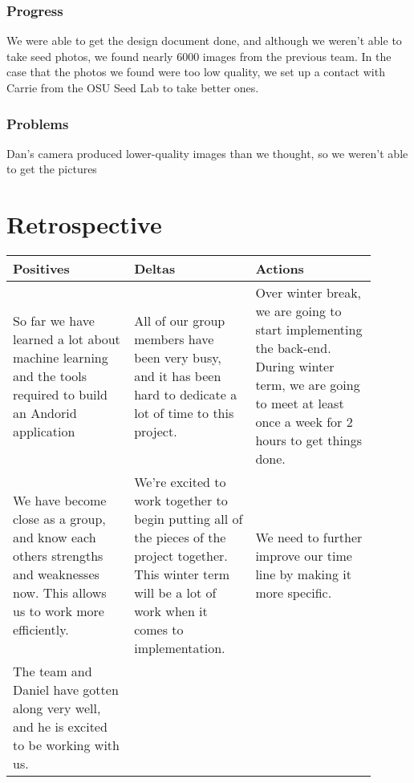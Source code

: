 \documentclass[onecolumn, draftclsnofoot,10pt, compsoc]{IEEEtran}
\begin{document}
        \subsubsection{Progress}
        We were able to get the design document done, and although we weren't able to take seed photos, we found nearly 6000 images from the previous team. In the case that the photos we found were too low quality, we set up a contact with Carrie from the OSU Seed Lab to take better ones. 
        
        \subsubsection{Problems}
        Dan's camera produced lower-quality images than we thought, so we weren't able to get the pictures


\clearpage

\section{Retrospective}

\begin{table}[ht]
	\begin{tabular}{|p{0.3\linewidth}|p{0.3\linewidth}|p{0.3\linewidth}|}
    \hline
    Positives & Deltas & Actions \\ \hline
    So far we have learned a lot about machine learning and the tools required to build an Andorid application &	
    All of our group members have been very busy, and it has been hard to dedicate a lot of time to this project. &
    Over winter break, we are going to start implementing the back-end. During winter term, we are going to meet at least once a week for 2 hours to get things done. \\ \hline
    We have become close as a group, and know each others strengths and weaknesses now. This allows us to work more efficiently. & We're excited to work together to begin putting all of the pieces of the project together. This winter term will be a lot of work when it comes to implementation. & We need to further improve our time line by making it more specific.  \\ \hline
    The team and Daniel have gotten along very well, and he is excited to be working with us. 
    && \\ \hline
    
    \end{tabular}
\end{table}

\printbibliography
\end{document}
